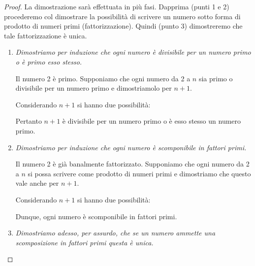 \begin{proof}
La dimostrazione sarà effettuata in più fasi. Dapprima (punti 1 e 2) procederemo col dimostrare la possibilità di scrivere un numero sotto forma di prodotto di numeri primi (fattorizzazione). Quindi (punto 3) dimostreremo che tale fattorizzazione è unica.

\begin{enumerate}
\item \emph{Dimostriamo per induzione che ogni numero è divisibile per un numero primo o è primo esso stesso.}

Il numero 2 è primo. Supponiamo che ogni numero da 2 a $n$ sia primo o divisibile per un numero primo e dimostriamolo per $n+1$.

Considerando $n+1$ si hanno due possibilità:
Pertanto $n+1$ è divisibile per un numero primo o è esso stesso un numero primo.

\item \emph{Dimostriamo per induzione che ogni numero è scomponibile in fattori primi.}

Il numero 2 è già banalmente fattorizzato. Supponiamo che ogni numero da 2 a $n$ si possa scrivere come prodotto di numeri primi e dimostriamo che questo vale anche per $n+1$.

Considerando $n+1$ si hanno due possibilità:

Dunque, ogni numero è scomponibile in fattori primi.

\item \emph{Dimostriamo adesso, per assurdo, che se un numero ammette una scomposizione in fattori primi questa è unica.}


\end{enumerate}
\end{proof}
